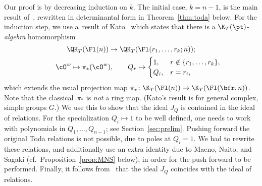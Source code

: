 Our proof is by decreasing induction on $k$. The initial case, $k=n-1$, is the main result of~\cite{maeno.naito.sagaki:QKideal}, rewritten in determinantal form in Theorem~\ref{thm:toda} below. For the induction step, we use a~result of Kato~\cite{kato2019quantum} which states that there is a
$\K_T(\pt)$-{\em algebra} homomorphism
\begin{gather}
\QK_T(\Fl(n)) \to \QK_T(\Fl(r_1, \dots , r_k;n)); \nonumber\\
\qquad{}\cO^w \mapsto \pi_*(\cO^w) ,
\qquad Q_r \mapsto \begin{cases} 1, & r \notin \{ r_1, \dots, r_k \}, \\
Q_i, & r=r_i ,\end{cases}\label{E:kato-push}
\end{gather}
which extends the usual projection map $\pi_*\colon \K_T(\Fl(n)) \to \K_T(\Fl(\bfr,n))$.
Note that the classical~$\pi_*$ is {\em not} a ring map. (Kato's result is for general complex, simple groups $G$.) We use this to show that the ideal $J_Q$ is contained in the ideal of relations.
For the specialization ${Q_i \mapsto 1}$ to be well defined, one needs to work with
polynomials in $Q_1, \dots, Q_{n-1}$; see Section~\ref{sec:prelim}.
Pushing forward the original Toda relations is not possible, due to poles at $Q_i=1$.
We had to rewrite these relations, and additionally
use an extra identity due to Maeno, Naito, and Sagaki
(cf.~Proposition~\ref{prop:MNS} below), in order for the push forward to be performed.
Finally, it follows from~\cite{GMSXZZ:Nakayama} that the ideal $J_Q$ coincides with the ideal of relations.
